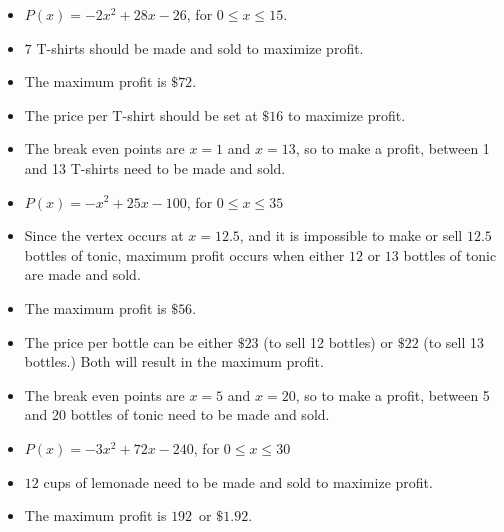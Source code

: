 \begin{exenum}
    
\item \begin{itemize}
    \item $P(x) = -2x^2+28x-26$, for $0 \leq x \leq 15$.
    \item $7$ T-shirts should be made and  sold to maximize profit. 
    \item The maximum profit is $\$72$. 
    \item The price per T-shirt should be set at $\$16$ to maximize profit. 
    \item The break even points are $x=1$ and $x=13$, so to make a profit, between 1 and 13 T-shirts need to be made and sold.
\end{itemize}

\item  \begin{itemize}

\item   $P(x) = -x^2+25x-100$, for $0 \leq x \leq 35$

\item  Since the vertex occurs at $x=12.5$, and it is impossible to make or sell $12.5$ bottles of tonic, maximum profit occurs when either $12$ or $13$ bottles of tonic are made and sold.

\item  The maximum profit is $\$56$.

\item  The price per bottle can be either $\$23$ (to sell 12 bottles) or $\$22$ (to sell 13 bottles.)  Both will result in the maximum profit.

\item The break even points are $x=5$ and $x=20$, so to make a profit, between 5 and 20 bottles of tonic need to be made and sold.

\end{itemize}


\item \begin{itemize}

\item  $P(x) = -3x^2+72x-240$, for $0 \leq x \leq 30$

\item  $12$ cups of lemonade need to be made and sold to maximize profit.

\item  The maximum profit is $192$\textcent \, or $\$1.92$.


\end{itemize}
\end{exenum}

